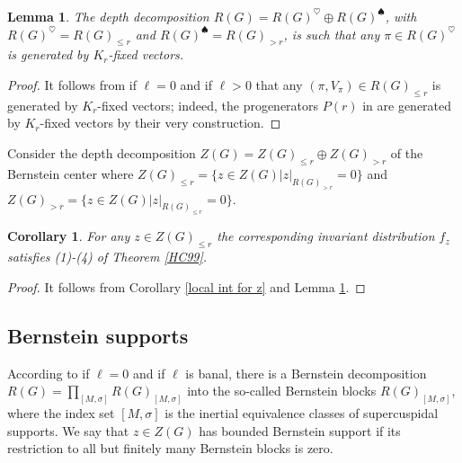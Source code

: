 \documentclass[12pt]{amsart}
\newtheorem{corollary}[thm]{Corollary}
\newtheorem{lemma}[thm]{Lemma}
\theoremstyle{definition}
\numberwithin{equation}{section}
\theoremstyle{remark}
\begin{document}
\begin{lemma}\label{K_r} 
 The depth decomposition $R(G)=R(G)^{\heartsuit}\oplus R(G)^{\spadesuit}$, with 
   $R(G)^{\heartsuit}=R(G)_{\leq r}$
   and $R(G)^{\spadesuit}= R(G)_{>r}$, %
   is such that any $\pi\in R(G)^{\heartsuit}$ is generated by $K_r$-fixed vectors.
\end{lemma}
\begin{proof}
It follows from 
\cite{MP94} if $\ell=0$ and 
\cite[Lemme A.3]{D09} if $\ell>0$ that  
any $(\pi,V_\pi)\in R(G)_{\leq r}$ is generated 
by $K_r$-fixed vectors; indeed, the progenerators $P(r)$ in \cite[p. 330]{D09} are generated by $K_r$-fixed vectors by their very construction. 
\end{proof}


Consider the depth decomposition $Z(G)=Z(G)_{\leq r}\oplus Z(G)_{>r}$ of the Bernstein center
where 
$Z(G)_{\leq r}=\{z\in Z(G)|z|_{R(G)_{>r}}=0 \}$
and $Z(G)_{>r}=\{z\in Z(G)|z|_{R(G)_{\leq r}}=0 \}$.



\begin{corollary}\label{bounded depth}
      For any $z\in Z(G)_{\leq r}$
the corresponding invariant distribution 
$f_z$ satisfies 
(1)-(4) of Theorem \ref{HC99}.
\end{corollary}
\begin{proof}
It follows from Corollary \ref{local int for z} and Lemma \ref{K_r}.
\end{proof}

\subsection{Bernstein supports}
According to \cite{BD84} if $\ell=0$ and \cite[Theorem 4.22]{DHKM24} if $\ell$ is banal, there is a Bernstein decomposition $R(G)=\prod_{[M,\sigma]} R(G)_{[M,\sigma]}$ into the so-called Bernstein blocks $R(G)_{[M,\sigma]}$, where the index set $[M,\sigma]$ is the inertial equivalence classes of supercuspidal supports. We say that $z\in Z(G)$ has bounded Bernstein support if its restriction to all but finitely many Bernstein blocks is zero.
\end{document}

